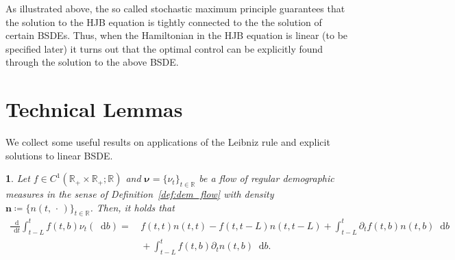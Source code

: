 \documentclass[11pt,oneside,english,reqno,dvipsnames,table]{amsart}
\numberwithin{equation}{section}
\theoremstyle{plain}
\theoremstyle{definition}
\theoremstyle{remark}
\theoremstyle{plain}
\newtheorem{lem}[thm]{\protect\lemmaname}
\theoremstyle{plain}
\theoremstyle{plain}
\theoremstyle{plain}
\theoremstyle{plain}
\theoremstyle{plain}
\theoremstyle{plain}
\providecommand{\lemmaname}{Lemma}
\newcommand{\bn}{\mathbf{n}}
\newcommand{\dd}{\mathop{}\!\mathrm{d}}
\newcommand{\mbR}{\mathbb{R}}
\newcommand{\bnu}{\boldsymbol{\nu}}
\numberwithin{thm}{section}
\begin{document}
As illustrated above, the so called stochastic maximum principle guarantees that the solution to the HJB equation is tightly connected to the the solution of certain BSDEs. Thus, when the Hamiltonian in the HJB equation is linear (to be specified later) it turns out that the optimal control can be explicitly found through the solution to the above BSDE.  

%


\section{Technical Lemmas}

We collect some useful results on applications of the Leibniz rule and explicit solutions to linear BSDE.
%
\begin{lem}\label{lem:diff_two_param_function_integral}
   Let $f\in C^1(\mbR_+\times \mbR_+ ;\mbR)$ and $\bnu = \{\nu_t\}_{t\in \mbR}$ be a flow of \emph{regular demographic measures} in the sense of Definition~\ref{def:dem_flow} with density $\bn \coloneqq \{n(t,\,\cdot\,)\}_{t\in \mbR}$. Then, it holds that
\begin{align*}
    \frac{\dd}{\dd t} \int_{t-L}^t f(t,b) \nu_t(\dd b)  = &\, f(t,t)n(t,t) -f(t,t-L)n(t,t-L) + \int_{t-L}^t \partial_t f(t,b) n(t,b)\dd b \\
    &\, + \int^t_{t-L} f(t,b) \partial_t n(t,b) \dd b.
\end{align*}
\end{lem}
\end{document}
